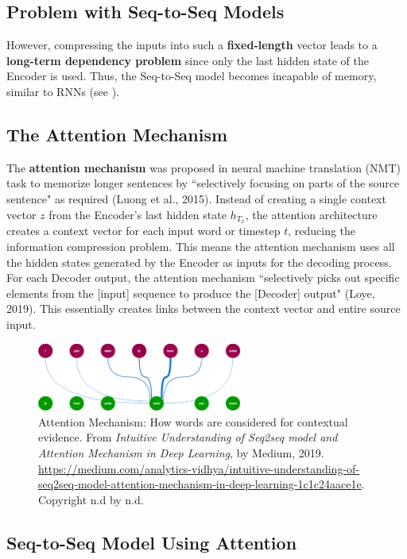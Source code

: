 \subsection{Problem with Seq-to-Seq Models}

However, compressing the inputs into such a \textbf{fixed-length} vector leads to a \textbf{long-term dependency problem} since only the last hidden state of the Encoder is used. Thus, the Seq-to-Seq model becomes incapable of memory, similar to RNNs (see ). 

\subsection{The Attention Mechanism}

The \textbf{attention mechanism} was proposed in neural machine translation (NMT) task to memorize longer sentences by ``selectively focusing on parts of the source sentence" as required (Luong et al., 2015). Instead of creating a single context vector $z$ from the Encoder's last hidden state $h_{T_x}$, the attention architecture creates a context vector for each input word or timestep $t$, reducing the information compression problem. This means the attention mechanism uses all the hidden states generated by the Encoder as inputs for the decoding process. For each Decoder output, the attention mechanism ``selectively picks out specific elements from the [input] sequence to produce the [Decoder] output" (Loye, 2019). This essentially creates links between the context vector and entire source input. 

\begin{figure}[h]
\centering
\includegraphics[width=0.6\textwidth]{imgs/attention.png}
\caption{\footnotesize Attention Mechanism: How words are considered for contextual evidence. From \emph{Intuitive Understanding of Seq2seq model and Attention Mechanism in Deep Learning}, by Medium, 2019. \url{https://medium.com/analytics-vidhya/intuitive-understanding-of-seq2seq-model-attention-mechanism-in-deep-learning-1c1c24aace1e}. Copyright n.d by n.d.}
\end{figure}

\subsection{Seq-to-Seq Model Using Attention}

